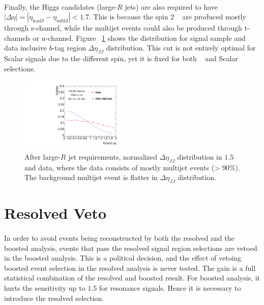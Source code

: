 \paragraph{}
Finally, the Higgs candidates (large-$R$ jets) are also required to have $|\Delta\eta| = |\eta_{\text{leadJ}} -\eta_{\text{sublJ}} |< 1.7$. 
This is because the spin 2 \Grav~ are produced mostly through s-channel, while the multijet events could also be produced through t-channels or u-channel. 
Figure ~\ref{fig:app-check-deta} shows the distribution for signal sample and data inclusive $b$-tag region $\Delta \eta_{JJ}$ distribution.
This cut is not entirely optimal for Scalar signals due to the different spin, yet it is fixed for both \Grav~ and Scalar selections.

\begin{figure}
\begin{center}
  \includegraphics[width=0.45\textwidth,angle=-90]{figures/boosted/Other/AllTag_Signal_hCandDeta_F_c10-cb-no-deta-cut_truth_0.pdf}
  \caption{ After large-$R$ jet requirements, normalized $\Delta \eta_{JJ}$ distribution in $1.5$ \TeV \Grav~ and data, where the data consists of mostly multijet events (> 90$\%$). The background multijet event is flatter in $\Delta \eta_{JJ}$ distribution.}
\label{fig:app-check-deta}
\end{center}
\end{figure}


\section{Resolved Veto}
\label{sec:resollvedveto}
\paragraph{}
In order to avoid events being reconstructed by both the resolved and the boosted analysis, events that pass the resolved signal region selections are vetoed in the boosted analysis.
This is a political decision, and the effect of vetoing boosted event selection in the resolved analysis is never tested.
The gain is a full statistical combination of the resolved and boosted result.
For boosted analysis,  it hurts the sensitivity up to $1.5$ \TeV for resonance signals.
Hence it is necessary to introduce the resolved selection.

